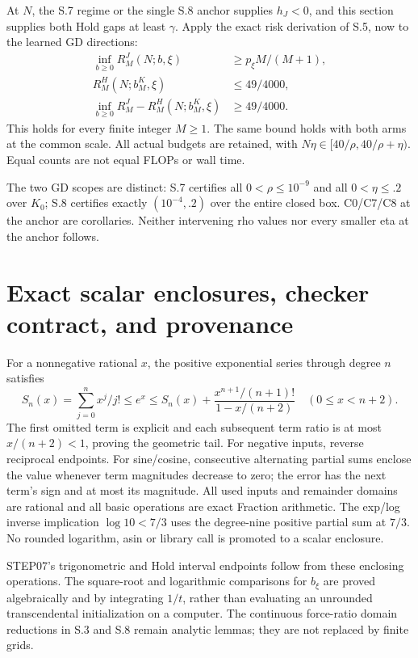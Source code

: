 \documentclass[11pt,a4paper]{article}
\begin{document}
At $N$, the S.7 regime or the single S.8 anchor supplies $h_J<0$, and this section supplies both Hold gaps at least $\gamma$. Apply the exact risk derivation of S.5, now to the learned GD directions:
\[
\begin{aligned}
 \inf_{b\ge0}R_M^J(N;b,\xi)&\ge p_\xi M/(M+1),\\
 R_M^H(N;b_M^K,\xi)&\le49/4000,\\
 \inf_{b\ge0}R_M^J-R_M^H(N;b_M^K,\xi)&\ge49/4000 .
\end{aligned}
\]
This holds for every finite integer $M\ge1$. The same bound holds with both arms at the common scale. All actual budgets are retained, with $N\eta\in[40/\rho,40/\rho+\eta)$. Equal counts are not equal FLOPs or wall time.

The two GD scopes are distinct: S.7 certifies all $0<\rho\le10^{-9}$ and all $0<\eta\le.2$ over $K_0$; S.8 certifies exactly $(10^{-4},.2)$ over the entire closed box. C0/C7/C8 at the anchor are corollaries. Neither intervening rho values nor every smaller eta at the anchor follows.

\section{Exact scalar enclosures, checker contract, and provenance}

For a nonnegative rational $x$, the positive exponential series through degree $n$ satisfies
\[
 S_n(x)=\sum_{j=0}^n x^j/j!\le e^x
 \le S_n(x)+\frac{x^{n+1}/(n+1)!}{1-x/(n+2)}
 \quad(0\le x<n+2).
\]
The first omitted term is explicit and each subsequent term ratio is at most $x/(n+2)<1$, proving the geometric tail. For negative inputs, reverse reciprocal endpoints. For sine/cosine, consecutive alternating partial sums enclose the value whenever term magnitudes decrease to zero; the error has the next term's sign and at most its magnitude. All used inputs and remainder domains are rational and all basic operations are exact Fraction arithmetic. The exp/log inverse implication $\log10<7/3$ uses the degree-nine positive partial sum at $7/3$. No rounded logarithm, asin or library call is promoted to a scalar enclosure.

STEP07's trigonometric and Hold interval endpoints follow from these enclosing operations. The square-root and logarithmic comparisons for $b_\xi$ are proved algebraically and by integrating $1/t$, rather than evaluating an unrounded transcendental initialization on a computer. The continuous force-ratio domain reductions in S.3 and S.8 remain analytic lemmas; they are not replaced by finite grids.
\end{document}
